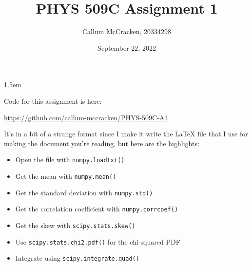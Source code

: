 \documentclass[11pt,letterpaper]{article}
\newcommand{\0}{\mathcal{O}}
\begin{document}
\thispagestyle{fancyplain}
\headheight 35pt
\author{Callum McCracken, 20334298}
\title{PHYS 509C Assignment 1}
\date{September 22, 2022}
\rfoot{\small\thepage}
\headsep 1.5em

\maketitle
\Large{Code for this assignment is here:

\url{https://github.com/callum-mccracken/PHYS-509C-A1}

It's in a bit of a strange format since I make it write the LaTeX file that I use for making the document you're reading, but here are the highlights:

\begin{itemize}
    \item Open the file with \texttt{numpy.loadtxt()}
    \item Get the mean with \texttt{numpy.mean()}
    \item Get the standard deviation with \texttt{numpy.std()}
    \item Get the correlation coefficient with \texttt{numpy.corrcoef()}
    \item Get the skew with \texttt{scipy.stats.skew()}
    \item Use \texttt{scipy.stats.chi2.pdf()} for the chi-squared PDF
    \item Integrate using \texttt{scipy.integrate.quad()}
\end{itemize}
}

\newpage


\newpage

\newpage

\newpage

\newpage

\newpage

\end{document}
